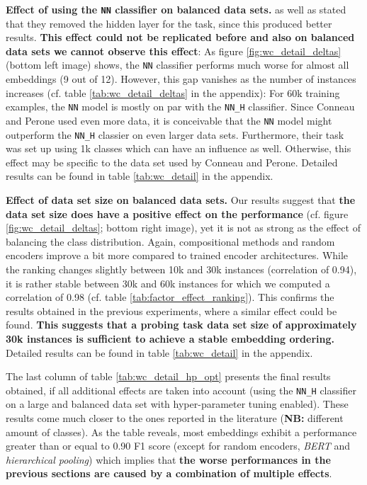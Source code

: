 

 \textbf{Effect of using the \texttt{NN} classifier on balanced data sets.} \citep{Conneau.2018a} as well as \citep{Perone.2018} stated that they removed the hidden layer for the  task, since this produced better results. \textbf{This effect could not be replicated before and also on balanced data sets we cannot observe this effect}: As figure \vref{fig:wc_detail_deltas} (bottom left image) shows, the \texttt{NN} classifier performs much worse for almost all embeddings (9 out of 12). However, this gap vanishes as the number of instances increases (cf. table \vref{tab:wc_detail_deltas} in the appendix): For 60k training examples, the \texttt{NN} model is mostly on par with the \texttt{NN\_H} classifier. Since Conneau and Perone used even more data, it is conceivable that the \texttt{NN} model might outperform the \texttt{NN\_H} classier on even larger data sets. Furthermore, their task was set up using 1k classes which can have an influence as well. Otherwise, this effect may be specific to the data set used by Conneau and Perone. Detailed results can be found in table \vref{tab:wc_detail} in the appendix.

 \textbf{Effect of data set size on balanced data sets.} Our results suggest that \textbf{the data set size does have a positive effect on the performance} (cf. figure \vref{fig:wc_detail_deltas}; bottom right image), yet it is not as strong as the effect of balancing the class distribution. Again, compositional methods and random encoders improve a bit more compared to trained encoder architectures. While the ranking changes slightly between 10k and 30k instances (correlation of 0.94), it is rather stable between 30k and 60k instances for which we computed a correlation of 0.98 (cf. table \vref{tab:factor_effect_ranking}). This confirms the results obtained in the previous experiments, where a similar effect could be found. \textbf{This suggests that a probing task data set size of approximately 30k instances is sufficient to achieve a stable embedding ordering.} Detailed results can be found in table \vref{tab:wc_detail} in the appendix.

The last column of table \vref{tab:wc_detail_hp_opt} presents the final results obtained, if all additional effects are taken into account (using the \texttt{NN\_H} classifier on a large and balanced data set with hyper-parameter tuning enabled). These results come much closer to the ones reported in the literature (\textbf{NB:} different amount of classes). As the table reveals, most embeddings exhibit a performance greater than or equal to 0.90 F1 score (except for random encoders, \textit{BERT} and \textit{hierarchical pooling}) which implies that \textbf{the worse performances in the previous sections are caused by a combination of multiple effects}.

